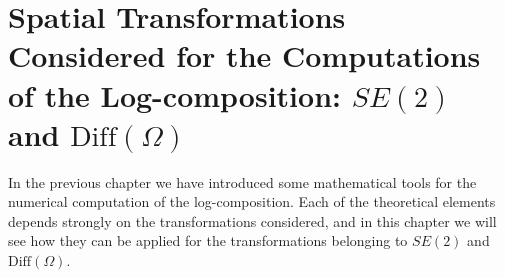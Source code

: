 \chapter{Spatial Transformations Considered for the Computations of the Log-composition: $SE(2)$ and $\text{Diff}(\Omega)$}\label{ch:spatial_transformations}



\noindent
In the previous chapter we have introduced some mathematical tools for the numerical computation of the log-composition. Each of the theoretical elements depends strongly on the transformations considered, and in this chapter we will see how they can be applied for the transformations belonging to $SE(2)$ and $\text{Diff}(\Omega)$.


